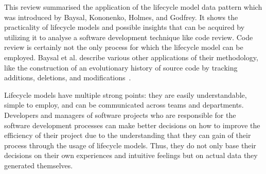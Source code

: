 \documentclass[conference]{IEEEtran}
\begin{document}
This review summarised the application of the lifecycle model data pattern which was introduced by Baysal, Kononenko, Holmes, and Godfrey. It shows the practicality of lifecycle models and possible insights that can be acquired by utilizing it to analyse a software development technique like code review. Code review is certainly not the only process for which the lifecycle model can be employed. Baysal et al. describe various other applications of their methodology, like the construction of an evolutionary history of source code by tracking additions, deletions, and modifications~\cite{baysal2015synthesizing}.

Lifecycle models have multiple strong points: they are easily understandable, simple to employ, and can be communicated across teams and departments. Developers and managers of software projects who are responsible for the software development processes can make better decisions on how to improve the efficiency of their project due to the understanding that they can gain of their process through the usage of lifecycle models. Thus, they do not only base their decisions on their own experiences and intuitive feelings but on actual data they generated themselves.



\end{document}

